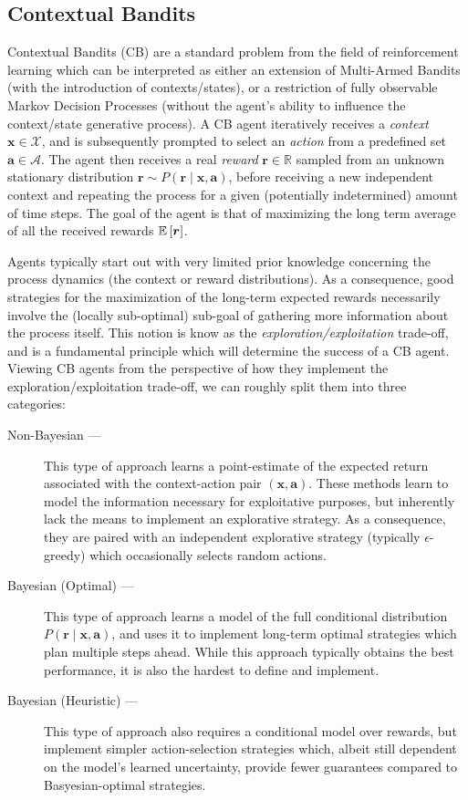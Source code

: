\documentclass[11pt]{article}
\begin{document}
\subsection{Contextual Bandits}

Contextual Bandits (CB) are a standard problem from the field of reinforcement
learning which can be interpreted as either an extension of Multi-Armed Bandits
(with the introduction of contexts/states), or a restriction of fully
observable Markov Decision Processes (without the agent's ability to influence
the context/state generative process).  A CB agent iteratively receives
a \emph{context} $\bm x\in\mathcal{X}$, and is subsequently prompted to select an
\emph{action} from a predefined set $\bm a\in\mathcal{A}$.  The agent then receives
a real \emph{reward} $\bm r\in\mathbb{R}$ sampled from an unknown stationary
distribution $\bm r\sim P(\bm r\mid \bm x, \bm a)$, before receiving a new
independent context and repeating the process for a given (potentially
indetermined) amount of time steps.  The goal of the agent is that of
maximizing the long term average of all the received rewards ${\mathbb{E}}\left[\bm
r\right]$.  

Agents typically start out with very limited prior knowledge concerning the
process dynamics (the context or reward distributions).  As a consequence, good
strategies for the maximization of the long-term expected rewards necessarily
involve the (locally sub-optimal) sub-goal of gathering more information about
the process itself.  This notion is know as the \emph{exploration/exploitation}
trade-off, and is a fundamental principle which will determine the success of
a CB agent.  Viewing CB agents from the perspective of how they implement the
exploration/exploitation trade-off, we can roughly split them into three
categories:
%
\begin{description}
  \item[Non-Bayesian ---]  This type of approach learns a point-estimate of the
    expected return associated with the context-action pair $(\bm x, \bm a)$.
    These methods learn to model the information necessary for exploitative
    purposes, but inherently lack the means to implement an explorative
    strategy.  As a consequence, they are paired with an independent
    explorative strategy (typically $\epsilon$-greedy) which occasionally
    selects random actions.
  \item[Bayesian (Optimal) ---]  This type of approach learns a model of the
    full conditional distribution $P(\bm r\mid \bm x, \bm a)$, and uses it to
    implement long-term optimal strategies which plan multiple steps ahead.
    While this approach typically obtains the best performance, it is also the
    hardest to define and implement.
  \item[Bayesian (Heuristic) ---]  This type of approach also requires
    a conditional model over rewards, but implement simpler action-selection
    strategies which, albeit still dependent on the model's learned uncertainty,
    provide fewer guarantees compared to Basyesian-optimal strategies.  
\end{description}
\end{document}
